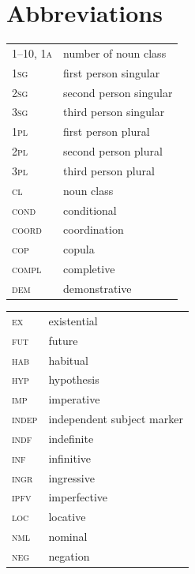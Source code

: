 \documentclass[output=paper,colorlinks,citecolor=brown]{langscibook}
\begin{document}
\section*{Abbreviations}
\begin{tabularx}{.5\textwidth}{lQ}%
\scshape 1--10, 1a &number of noun class \\ 
\scshape 1sg & first person singular \\ 
\scshape 2sg & second person singular \\ 
\scshape 3sg & third person singular \\ 
\scshape 1pl & first person plural\\ 
\scshape 2pl & second person plural\\ 
\scshape 3pl & third person plural\\ 
\scshape cl & noun class\\ 
\scshape cond &conditional \\ 
\scshape coord &coordination \\
\scshape cop &copula \\ 
\scshape compl &completive \\ 
\scshape dem &demonstrative \\ 
\end{tabularx}
\begin{tabularx}{.5\textwidth}{lQ}%
\scshape ex & existential \\ 
\scshape fut &future \\ 
\scshape hab &habitual \\ 
\scshape hyp &hypothesis \\ 
\scshape imp &imperative \\ 
\scshape indep &independent subject marker \\
\scshape indf &indefinite \\ 
\scshape inf &infinitive \\ 
\scshape ingr &ingressive \\  
\scshape ipfv &imperfective \\ 
\scshape loc &locative \\ 
\scshape nml &nominal  \\ 
\scshape neg &negation \\ 
\end{tabularx}
\end{document}
